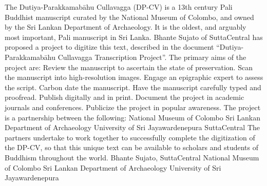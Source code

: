 The Dutiya-Parakkamabāhu Cullavagga (DP-CV) is a 13th century Pali Buddhist manuscript curated by the National Museum of Colombo, and owned by the Sri Lankan Department of Archaeology. It is the oldest, and arguably most important, Pali manuscript in Sri Lanka.\markdownRendererInterblockSeparator
{}Bhante Sujato of SuttaCentral has proposed a project to digitize this text, described in the document “Dutiya-Parakkamabāhu Cullavagga Transcription Project”. The primary aims of the project are:\markdownRendererInterblockSeparator
{}\markdownRendererUlBegin
\markdownRendererUlItem Review the manuscript to ascertain the state of preservation.\markdownRendererUlItemEnd 
\markdownRendererUlItem Scan the manuscript into high-resolution images.\markdownRendererUlItemEnd 
\markdownRendererUlItem Engage an epigraphic expert to assess the script.\markdownRendererUlItemEnd 
\markdownRendererUlItem Carbon date the manuscript.\markdownRendererUlItemEnd 
\markdownRendererUlItem Have the manuscript carefully typed and proofread.\markdownRendererUlItemEnd 
\markdownRendererUlItem Publish digitally and in print.\markdownRendererUlItemEnd 
\markdownRendererUlItem Document the project in academic journals and conferences.\markdownRendererUlItemEnd 
\markdownRendererUlItem Publicize the project in popular awareness.\markdownRendererUlItemEnd 
\markdownRendererUlEnd \markdownRendererInterblockSeparator
{}The project is a partnership between the following:\markdownRendererInterblockSeparator
{}\markdownRendererUlBegin
\markdownRendererUlItem National Museum of Colombo\markdownRendererUlItemEnd 
\markdownRendererUlItem Sri Lankan Department of Archaeology\markdownRendererUlItemEnd 
\markdownRendererUlItem University of Sri Jayawardenepura\markdownRendererUlItemEnd 
\markdownRendererUlItem SuttaCentral\markdownRendererUlItemEnd 
\markdownRendererUlEnd \markdownRendererInterblockSeparator
{}The partners undertake to work together to successfully complete the digitization of the DP-CV, so that this unique text can be available to scholars and students of Buddhism throughout the world.\markdownRendererInterblockSeparator
{} Bhante Sujato, SuttaCentral\markdownRendererInterblockSeparator
{} National Museum of Colombo\markdownRendererInterblockSeparator
{} Sri Lankan Department of Archaeology\markdownRendererInterblockSeparator
{} University of Sri Jayawardenepura\markdownRendererInterblockSeparator
{}\relax